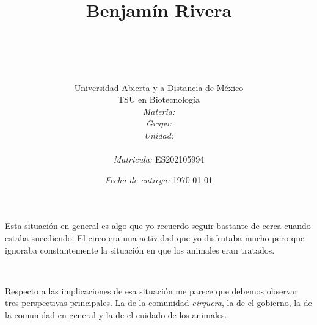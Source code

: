 \documentclass[12pt]{article}
\title{
	\ \\ Benjam\'in Rivera \\
	\bf{\titulo}\\\ \\}
\author{
	{\Huge Universidad Abierta y a Distancia de México}\\
	TSU en Biotecnolog\'ia \\
	\textit{Materia:} \materia \\
	\textit{Grupo:} \grupo \\
	\textit{Unidad:} \unidad \\
	\\
	\textit{Matricula:} ES202105994 }
\date{\textit{Fecha de entrega:} \today}
\begin{document}
\maketitle\newpage

 \par Esta situación en general es algo que yo recuerdo seguir bastante de cerca cuando estaba sucediendo. El circo era una actividad que yo disfrutaba mucho pero que ignoraba constantemente la situación en que los animales eran tratados.
 
 \par \
 \par Respecto a las implicaciones de esa situación me parece que debemos observar tres perspectivas principales. La de la comunidad \textit{cirquera}, la de el gobierno, la de la comunidad en general y la de el cuidado de los animales. 
 
\end{document}
